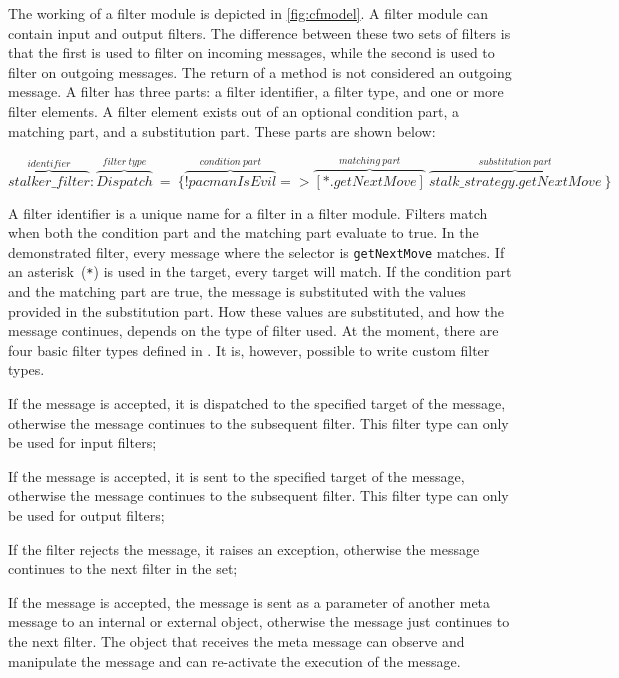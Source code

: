 The working of a filter module is depicted in \autoref{fig:cfmodel}.
A filter module can contain input and output filters.
The difference between these two sets of filters is that the first is used to filter on incoming messages, while the second is used to filter on outgoing messages.
The return of a method is not considered an outgoing message.
A filter has three parts: a filter identifier, a filter type, and one or more filter elements.
A filter element exists out of an optional condition part, a matching part, and a substitution part.
These parts are shown below:
\begin{center}
$\overbrace{stalker\_filter}^{identifier}:\overbrace{Dispatch}^{filter~type}~=~\{\overbrace{!pacmanIsEvil}^{condition~part}
=>\overbrace{[*.getNextMove]}^{matching~part}~\overbrace{stalk\_strategy.getNextMove}^{substitution~part}~\}$
\end{center}
A filter identifier is a unique name for a filter in a filter module. 
Filters match when both the condition part and the matching part evaluate to true.
In the demonstrated filter, every message where the selector is \lstinline|getNextMove| matches.
If an asterisk~(\lstinline|*|) is used in the target, every target will match.
If the condition part and the matching part are true, the message is substituted with the values provided in the substitution part.
How these values are substituted, and how the message continues, depends on the type of  filter used.
\newpage
At the moment, there are four basic filter types defined in \Compose*.
It is, however, possible to write custom filter types.
\begin{description}[style=sameline,leftmargin=18mm]
  \item[Dispatch] If the message is accepted, it is dispatched to the specified target of the message, otherwise the message continues to the subsequent filter.
    This filter type can only be used for input filters;
  \item[Send] If the message is accepted, it is sent to the specified target of the message, otherwise the message continues to the subsequent filter.
    This filter type can only be used for output filters;
  \item[Error] If the filter rejects the message, it raises an exception, otherwise the message continues to the next filter in the set;
  \item[Meta] If the message is accepted, the message is sent as a parameter of another meta message to an internal or external object, otherwise the message just continues to the next filter.
    The object that receives the meta message can observe and manipulate the message and can re-activate the execution of the message.
\end{description}

